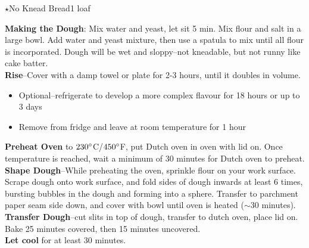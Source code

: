 \begin{recipe}{\texorpdfstring{$\star$}{str}No Knead Bread}{1 loaf}{}


    \textbf{Making the Dough}: Mix water and yeast, let sit 5 min. Mix flour and salt in a large bowl. Add water and yeast mixture, then use a spatula to mix until all flour is incorporated. Dough will be wet and sloppy--not kneadable, but not runny like cake batter.\\

    \textbf{Rise}--Cover with a damp towel or plate for 2-3 hours, until it doubles in volume.
    \begin{itemize}
        \item Optional--refrigerate to develop a more complex flavour for 18 hours or up to 3 days
        \item Remove from fridge and leave at room temperature for 1 hour
    \end{itemize}

    \textbf{Preheat Oven} to $230\degree$C/$450\degree$F, put Dutch oven in oven with lid on. Once temperature is reached, wait a minimum of 30 minutes for Dutch oven to preheat.\\

    \textbf{Shape Dough}--While preheating the oven, sprinkle flour on your work surface. Scrape dough onto work surface, and fold sides of dough inwards at least 6 times, bursting bubbles in the dough and forming into a sphere. Transfer to parchment paper seam side down, and cover with bowl until oven is heated ($\sim 30$ minutes).\\

    \textbf{Transfer Dough}--cut slits in top of dough, transfer to dutch oven, place lid on. Bake 25 minutes covered, then 15 minutes uncovered.\\

    \textbf{Let cool} for at least 30 minutes.
\end{recipe}